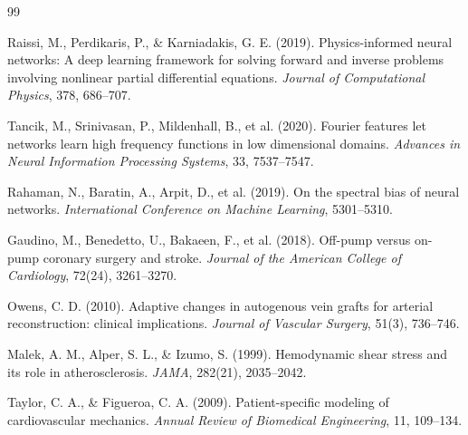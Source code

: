 \documentclass[12pt,a4paper]{article}
\begin{document}

\begin{thebibliography}{99}

Raissi, M., Perdikaris, P., \& Karniadakis, G. E. (2019). Physics-informed neural networks: A deep learning framework for solving forward and inverse problems involving nonlinear partial differential equations. \textit{Journal of Computational Physics}, 378, 686--707.

Tancik, M., Srinivasan, P., Mildenhall, B., et al. (2020). Fourier features let networks learn high frequency functions in low dimensional domains. \textit{Advances in Neural Information Processing Systems}, 33, 7537--7547.

Rahaman, N., Baratin, A., Arpit, D., et al. (2019). On the spectral bias of neural networks. \textit{International Conference on Machine Learning}, 5301--5310.

Gaudino, M., Benedetto, U., Bakaeen, F., et al. (2018). Off-pump versus on-pump coronary surgery and stroke. \textit{Journal of the American College of Cardiology}, 72(24), 3261--3270.

Owens, C. D. (2010). Adaptive changes in autogenous vein grafts for arterial reconstruction: clinical implications. \textit{Journal of Vascular Surgery}, 51(3), 736--746.

Malek, A. M., Alper, S. L., \& Izumo, S. (1999). Hemodynamic shear stress and its role in atherosclerosis. \textit{JAMA}, 282(21), 2035--2042.

Taylor, C. A., \& Figueroa, C. A. (2009). Patient-specific modeling of cardiovascular mechanics. \textit{Annual Review of Biomedical Engineering}, 11, 109--134.

\end{thebibliography}
\end{document}
